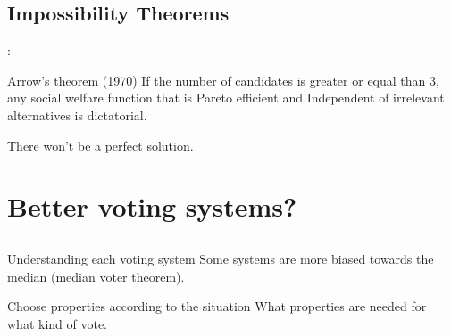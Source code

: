 \documentclass[utf8]{earlywinter}
\begin{document}
\subsection{Impossibility Theorems}
\begin{frame}{\secname: \subsecname}

  \begin{block}{Arrow's theorem (1970)}
    If the number of candidates is greater or equal than 3, any social welfare function that is Pareto efficient and Independent of irrelevant alternatives is dictatorial.
  \end{block}

  \begin{alertblock}{There won't be a perfect solution.}
  \end{alertblock}

\end{frame}


 
\section[Solutions]{Better voting systems?}

\subsection{ }
\begin{frame}{\secname}

  \begin{exampleblock}{Understanding each voting system}
    Some systems are more biased towards the median (median voter theorem).
  \end{exampleblock}

  \begin{exampleblock}{Choose properties according to the situation}
    What properties are needed for what kind of vote.
  \end{exampleblock}

\end{frame}
\end{document}
